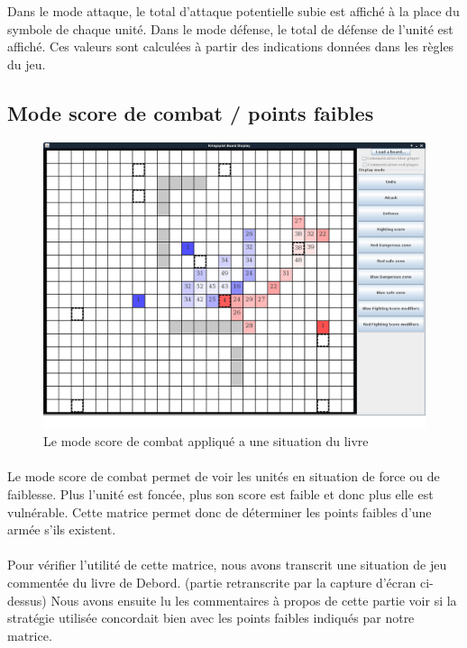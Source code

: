 			Dans le mode attaque, le total d'attaque potentielle subie est affiché à la place du symbole de chaque unité.
			Dans le mode défense, le total de défense de l'unité est affiché.
			Ces valeurs sont calculées à partir des indications données dans les règles du jeu.
			\clearpage	

		\subsection{Mode score de combat / points faibles}

			\begin{figure}[!h]
				\centerline{\includegraphics[scale=0.35]{images/screen_fscore.png}}
				\caption{Le mode score de combat appliqué a une situation du livre}
			\end{figure}
			
			\paragraph{}
			Le mode score de combat permet de voir les unités en situation de force ou de faiblesse.
			Plus l'unité est foncée, plus son score est faible et donc plus elle est vulnérable.
			Cette matrice permet donc de déterminer les points faibles d'une armée s'ils existent.
			
			\paragraph{}
			Pour vérifier l'utilité de cette matrice, nous avons transcrit une situation de jeu commentée du livre de Debord.\cite{ref2} (partie retranscrite
			par la capture d'écran ci-dessus) Nous avons ensuite lu les commentaires à propos de cette partie voir si la stratégie utilisée concordait bien
			avec les points faibles indiqués par notre matrice.

